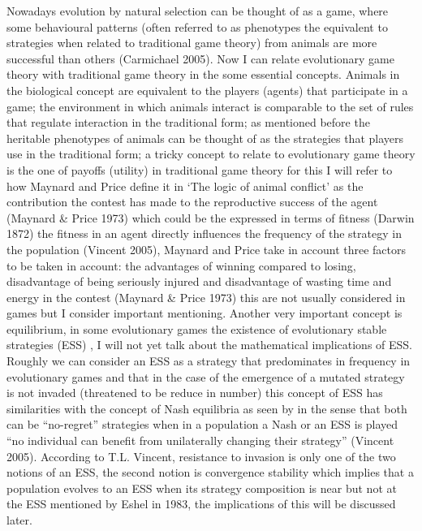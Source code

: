\documentclass{article}
\begin{document}
Nowadays evolution by natural selection can be thought of as a game, where some behavioural patterns (often referred to as phenotypes the equivalent to strategies when related to traditional game theory) from animals are more successful than others (Carmichael 2005). Now I can relate evolutionary game theory with traditional game theory in the some essential concepts. Animals in the biological concept are equivalent to the players (agents) that participate in a game; the environment in which animals interact is comparable to the set of rules that regulate interaction in the traditional form; as mentioned before the heritable phenotypes of animals can be thought of as the strategies that players use in the traditional form; a tricky concept to relate to evolutionary game theory is the one of payoffs (utility) in traditional game theory  for this I will refer to how Maynard and Price define it in ‘The logic of animal conflict’ as the contribution the contest has made to the reproductive success of the agent (Maynard \& Price 1973) which could be the expressed in terms of fitness  (Darwin 1872) the fitness in an agent directly influences the frequency of the strategy in the population (Vincent 2005), Maynard and Price take in account three factors to be taken in account: the advantages of winning compared to losing, disadvantage of being seriously injured and disadvantage of wasting time and energy in the contest (Maynard \& Price 1973) this are not usually considered in games but I consider important mentioning. Another very important concept is equilibrium, in some evolutionary games the existence of evolutionary stable strategies (ESS) , I will not yet talk about the mathematical implications of  ESS. Roughly we can consider an ESS as a strategy that predominates in frequency in evolutionary games and that in the case of the emergence of a mutated strategy is not invaded (threatened to be reduce in number) this concept of ESS has similarities with the concept of Nash equilibria as seen by in the sense that both can be “no-regret” strategies when in a population a Nash or an ESS is played “no individual can benefit from unilaterally changing their strategy” (Vincent 2005). According to T.L. Vincent, resistance to invasion is only one of the two notions of an ESS, the second notion is convergence stability which implies that a population evolves to an ESS when its strategy composition is near but not at the ESS mentioned by Eshel in 1983, the implications of this will be discussed later.
\end{document}
